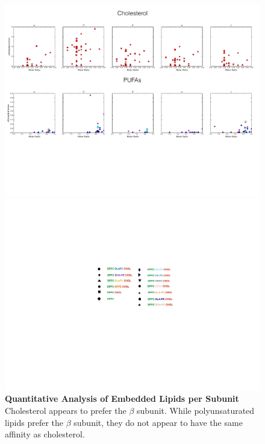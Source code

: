 \documentclass[10pt, letterpaper]{article}
\begin{document}
\begin{figure}[H]
   \centerline{\includegraphics[width=\textwidth,scale=0.55]{Intra.pdf}}
   \centerline{\includegraphics[scale=0.45]{Legend.pdf}}
   
   \caption[Quantitative Analysis of Embedded Lipids per Subunit]{\textbf{Quantitative Analysis of Embedded Lipids per Subunit} Cholesterol appears to prefer the $\beta$ subunit. While polyunsaturated lipids prefer the $\beta$ subunit, they do not appear to have the same affinity as cholesterol.}\label{fig:intra}
\end{figure}
   \newpage
\end{document}
